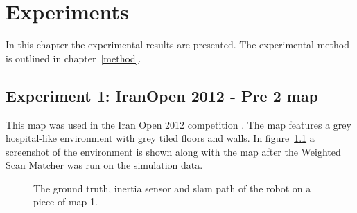 \chapter{Experiments}
\label{experiments}
In this chapter the experimental results are presented. The experimental method is outlined in chapter~\ref{method}. 

\section{Experiment 1: IranOpen 2012 - Pre 2 map}
This map was used in the Iran Open 2012 competition \cite{iran2012}. The map features a grey hospital-like environment with grey tiled floors and walls. In figure~\ref{fig:map1} a screenshot of the environment is shown along with the map after the Weighted Scan Matcher was run on the simulation data. 

\begin{figure}[ht]
\centering
{}
  \caption{The ground truth, inertia sensor and slam path of the robot on a piece of map 1.}
  \label{fig:map1}
\end{figure}

